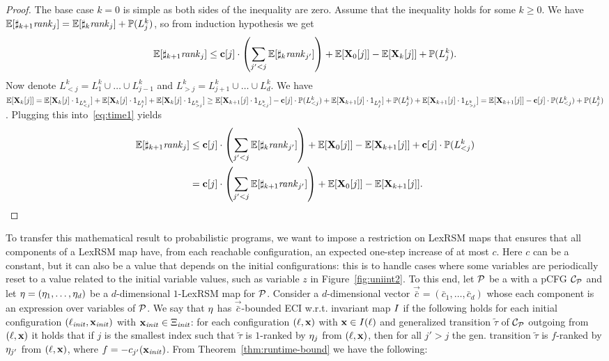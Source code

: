 \begin{proof}
The base case $k=0$ is simple as both sides of the inequality are zero. Assume 
that the inequality holds for some $k\geq 0$. We have 
$\mathbb{E}[\sharp_{k+1}\mathit{rank}_{j}]=\mathbb{E}[\sharp_{k}\mathit{rank}_{j}]+\mathbb{P}{(L_j^{k})}$, so from 
induction hypothesis we get 
\begin{equation}
\label{eq:time1}
\mathbb{E}[\sharp_{k+1}\mathit{rank}_{j}]\leq 
\mathbf{c}[j]\cdot\left(\sum_{j'<j}\mathbb{E}[\sharp_{k}\mathit{rank}_{j'}] \right)+ 
\mathbb{E}[\mathbf{X}_{0}[j]] - \mathbb{E}[\mathbf{X}_{k}[j]] + \mathbb{P}{(L_j^{k})}.\end{equation} 
Now denote 
$L^k_{<j} = L^k_1 \cup \dots\cup L^k_{j-1}$ and $L^k_{>j}= 
L^k_{j+1}\cup\dots\cup L^k_{d}$. We have  
$\mathbb{E}[\mathbf{X}_{k}[j]] = \mathbb{E}[\mathbf{X}_{k}[j]\cdot 
{1}_{ L_{<j}^k}] + \mathbb{E}[\mathbf{X}_{k}[j]\cdot 
{1}_{ L_j^k}] + \mathbb{E}[\mathbf{X}_{k}[j]\cdot 
	{1}_{L_{>j}^k}] \geq 
\mathbb{E}[\mathbf{X}_{k+1}[j]\cdot 
	{1}_{ L_{<j}^k}] -\mathbf{c}[j]\cdot \mathbb{P}(L_{<j}^k) + 
	\mathbb{E}[\mathbf{X}_{k+1}[j]\cdot 
	{1}_{ L_{j}^k}] + \mathbb{P}(L_{j}^k) + \mathbb{E}[\mathbf{X}_{k+1}[j]\cdot 
	{1}_{ L_{>j}^k}]= \mathbb{E}[\mathbf{X}_{k+1}[j]] -\mathbf{c}[j]\cdot 
	\mathbb{P}(L_{<j}^k)+ \mathbb{P}(L_{j}^k)$. Plugging this 
	into~\ref{eq:time1} yields
\begin{align*}
\mathbb{E}[\sharp_{k+1}\mathit{rank}_{j}]&\leq 
\mathbf{c}[j]\cdot\left(\sum_{j'<j}\mathbb{E}[\sharp_{k}\mathit{rank}_{j'}] \right)+ 
\mathbb{E}[\mathbf{X}_{0}[j]] - \mathbb{E}[\mathbf{X}_{k+1}[j]] + \mathbf{c}[j]\cdot 
\mathbb{P}(L_{<j}^k)\\
&=\mathbf{c}[j]\cdot\left(\sum_{j'<j}\mathbb{E}[\sharp_{k+1}\mathit{rank}_{j'}] \right)+ 
\mathbb{E}[\mathbf{X}_{0}[j]] - \mathbb{E}[\mathbf{X}_{k+1}[j]].
\end{align*}
%
\end{proof}

To transfer this mathematical result to probabilistic programs, we want to 
impose a restriction on LexRSM maps that ensures that all components of a 
LexRSM map have, from each reachable configuration, an expected one-step 
increase of at most $c$. Here $c$ can be a constant, but it can also be a value 
that depends on the initial configurations: this is to handle cases where some 
variables are periodically reset to a value related to the initial variable 
values, such as variable $z$ in Figure~\ref{fig:uniint2}. To this end, let 
$\mathcal{P}$ be a \PP{} with a pCFG $\mathcal{C}_{\mathcal{P}}$ and let 
$\mathbf{\eta}=(\eta_1,\dots,\eta_d)$ be a 
$d$-dimensional $1$-LexRSM map for $\mathcal{P}$. Consider a $d$-dimensional 
vector 
$\vec{\bar{c}}=(\bar{c}_1,\dots,\bar{c}_d)$ whose each component is an 
expression over variables of 
$\mathcal{P}$. We say 
that $\mathbf{\eta}$ has 
$\vec{\bar{c}}$-bounded ECI w.r.t. invariant map $I$ if the following holds 
for each initial configuration $(\ell_{\mathit{init}},\mathbf{x}_{\mathit{init}})$ with $\mathbf{x}_{\mathit{init}}\in 
\Xi_{\mathit{init}}$: for 
each 
configuration $(\ell,\mathbf{x})$ with $\mathbf{x}\in I(\ell)$ and generalized 
transition $\tilde{\tau}$ 
of 
$\mathcal{C}_{\mathcal{P}}$ outgoing from $(\ell,\mathbf{x})$ it holds that if $j$ is 
the smallest index such that 
$\tilde{\tau}$ is $1$-ranked by $\eta_j$ from $(\ell,\mathbf{x})$, then for all 
$j'>j$ the gen. transition $\tilde{\tau}$ is $f$-ranked by $\eta_{j'}$ from 
$(\ell,\mathbf{x})$, where $f=-c_{j'}(\mathbf{x}_{\mathit{init}})$. From 
Theorem~\ref{thm:runtime-bound} we have the following:

